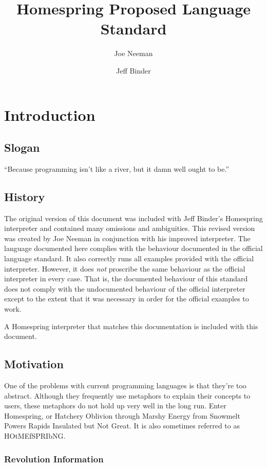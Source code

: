 \documentclass[10pt]{article}
\title{Homespring Proposed Language Standard}
\author{Joe Neeman \and Jeff Binder}
\begin{document}
\maketitle

\section{Introduction}

\subsection{Slogan}

``Because programming isn't like a river, but it damn well ought to be.''

\subsection{History}
The original version of this document was included with Jeff Binder's Homespring interpreter and contained many
omissions and ambiguities. This revised version was created by Joe Neeman in conjunction with his improved interpreter.
The language documented here complies with the behaviour documented in the official language standard. It also
correctly runs all examples provided with the official interpreter. However, it does \emph{not} proscribe the same
behaviour as the official interpreter in every case. That is, the documented behaviour of this standard does not comply
with the undocumented behaviour of the official interpreter except to the extent that it was necessary in order for
the official examples to work.

A Homespring interpreter that matches this documentation is included with this document.

\subsection{Motivation}

One of the problems with current programming languages is that they're too abstract. Although they frequently use metaphors to explain their concepts to users, these metaphors do not hold up very well in the long run. Enter Homespring, or Hatchery Oblivion through Marshy Energy from Snowmelt Powers Rapids Insulated but Not Great. It is also sometimes referred to as HOtMEfSPRIbNG.

\subsubsection{Revolution Information}
\end{document}
